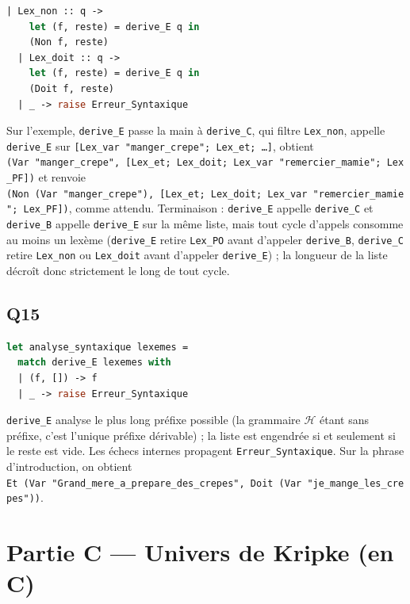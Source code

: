 \documentclass[11pt,a4paper]{article}
\begin{document}
\begin{lstlisting}[language=Caml]
  | Lex_non :: q ->
    let (f, reste) = derive_E q in
    (Non f, reste)
  | Lex_doit :: q ->
    let (f, reste) = derive_E q in
    (Doit f, reste)
  | _ -> raise Erreur_Syntaxique
\end{lstlisting}

Sur l'exemple, \texttt{derive\_E} passe la main à \texttt{derive\_C}, qui filtre \texttt{Lex\_non}, appelle \texttt{derive\_E} sur \texttt{{[}Lex\_var\ "manger\_crepe";\allowbreak{}\ Lex\_et;\allowbreak{}\ …{]}\allowbreak{}}, obtient \texttt{(\allowbreak{}Var\ "manger\_crepe",\allowbreak{}\ {[}Lex\_et;\allowbreak{}\ Lex\_doit;\allowbreak{}\ Lex\_var\ "remercier\_mamie";\allowbreak{}\ Lex\_PF{]}\allowbreak{})\allowbreak{}} et renvoie \texttt{(\allowbreak{}Non\ (\allowbreak{}Var\ "manger\_crepe")\allowbreak{},\allowbreak{}\ {[}Lex\_et;\allowbreak{}\ Lex\_doit;\allowbreak{}\ Lex\_var\ "remercier\_mamie";\allowbreak{}\ Lex\_PF{]}\allowbreak{})\allowbreak{}}, comme attendu. Terminaison : \texttt{derive\_E} appelle \texttt{derive\_C} et \texttt{derive\_B} appelle \texttt{derive\_E} sur la même liste, mais tout cycle d'appels consomme au moins un lexème (\texttt{derive\_E} retire \texttt{Lex\_PO} avant d'appeler \texttt{derive\_B}, \texttt{derive\_C} retire \texttt{Lex\_non} ou \texttt{Lex\_doit} avant d'appeler \texttt{derive\_E}) ; la longueur de la liste décroît donc strictement le long de tout cycle.

\hypertarget{q15}{%
\subsection{Q15}\label{q15}}

\begin{lstlisting}[language=Caml]
let analyse_syntaxique lexemes =
  match derive_E lexemes with
  | (f, []) -> f
  | _ -> raise Erreur_Syntaxique
\end{lstlisting}

\texttt{derive\_E} analyse le plus long préfixe possible (la grammaire \(\mathcal H\) étant sans préfixe, c'est l'unique préfixe dérivable) ; la liste est engendrée si et seulement si le reste est vide. Les échecs internes propagent \texttt{Erreur\_Syntaxique}. Sur la phrase d'introduction, on obtient \texttt{Et\ (\allowbreak{}Var\ "Grand\_mere\_a\_prepare\_des\_crepes",\allowbreak{}\ Doit\ (\allowbreak{}Var\ "je\_mange\_les\_crepes")\allowbreak{})\allowbreak{}}.

\hypertarget{partie-c-univers-de-kripke-en-c}{%
\section{Partie C --- Univers de Kripke (en C)}\label{partie-c-univers-de-kripke-en-c}}
\end{document}
